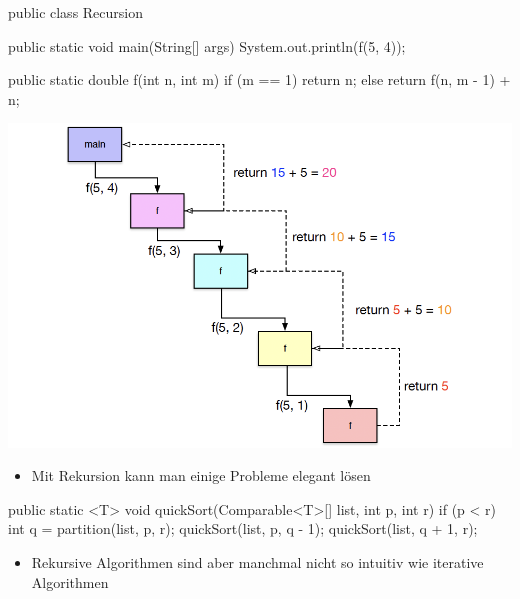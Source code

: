 \documentclass[a4paper,10pt, dvipsnames]{report}
\begin{document}
\begin{minipage}{0.48\linewidth}
\begin{javacodebox}
public class Recursion {
    public static void main(String[] args) {
        System.out.println(f(5, 4));
    }

    public static double f(int n, int m) {
        if (m == 1)
            return n;
        else
            return f(n, m - 1) + n;
    }
}
\end{javacodebox}
\end{minipage}
\hfill
\begin{minipage}{0.48\linewidth}
    \begin{center}
        \includegraphics[width=1\linewidth]{resources/Rekursion.png}
    \end{center}
\end{minipage}


\begin{itemize}
	\item Mit Rekursion kann man einige Probleme elegant lösen
\end{itemize}

\begin{javacodebox}
public static <T> void quickSort(Comparable<T>[] list, int p, int r) {
    if (p < r) {
        int q = partition(list, p, r);
        quickSort(list, p, q - 1);
        quickSort(list, q + 1, r);
    }
}
\end{javacodebox}

\begin{itemize}
	\item Rekursive Algorithmen sind aber manchmal nicht so intuitiv wie iterative Algorithmen
\end{itemize}
\end{document}
